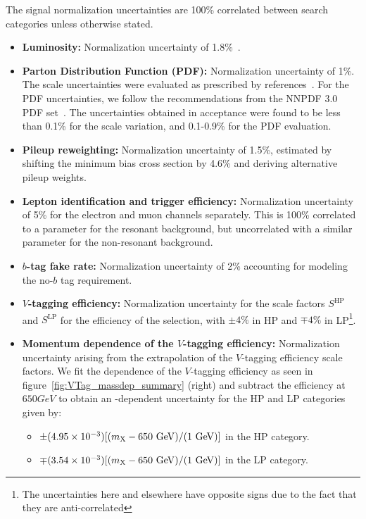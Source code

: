 The signal normalization uncertainties are 100\% correlated between search categories unless otherwise stated.
\begin{itemize}
  \item {\bfseries Luminosity:} Normalization uncertainty of 1.8\%~\cite{CMS-LUM-17-003,CMS-PAS-LUM-17-004,CMS-PAS-LUM-18-002}.
  \item {\bfseries Parton Distribution Function (PDF):} Normalization uncertainty of 1\%.
  The scale uncertainties were evaluated as prescribed by references~\cite{Cacciari_2004,Catani_2003}.
  For the PDF uncertainties, we follow the recommendations from the NNPDF 3.0 PDF set~\cite{Ball2011296}.
  The uncertainties obtained in acceptance were found to be less than 0.1\% for the scale variation, and 0.1-0.9\% for the PDF evaluation.
  \item {\bfseries Pileup reweighting:} Normalization uncertainty of 1.5\%, estimated by shifting the minimum bias cross section by 4.6\% and deriving alternative pileup weights.
  \item {\bfseries Lepton identification and trigger efficiency:} Normalization uncertainty of 5\% for the electron and muon channels separately.
  This is 100\% correlated to a parameter for the resonant background, but uncorrelated with a similar parameter for the non-resonant background.
  \item {\bfseries $b$-tag fake rate:} Normalization uncertainty of 2\% accounting for modeling the no-$b$ tag requirement.
  \item {\bfseries $V$-tagging efficiency:} Normalization uncertainty for the scale factors $S^\mathrm{HP}$ and $S^\mathrm{LP}$ for the efficiency of the \nsubjDDT selection, with $\pm4\%$ in HP and $\mp4\%$ in LP\footnote{The uncertainties here and elsewhere have opposite signs due to the fact that they are anti-correlated}.
  \item {\bfseries Momentum dependence of the $V$-tagging efficiency:} Normalization uncertainty arising from the extrapolation of the $V$-tagging efficiency scale factors.
  We fit the \MX dependence of the $V$-tagging efficiency as seen in figure~\ref{fig:VTag_massdep_summary} (right) and subtract the efficiency at $650\unit{GeV}$ to obtain an \MX-dependent uncertainty for the HP and LP categories given by:
  \begin{itemize}
    \item $\pm(4.95\times10^{-3})[(\MX-650\unit{GeV})/(1\unit{GeV})]$ in the HP category.
    \item $\mp(3.54\times10^{-3})[(\MX-650\unit{GeV})/(1\unit{GeV})]$ in the LP category.

\end{itemize}
\end{itemize}
